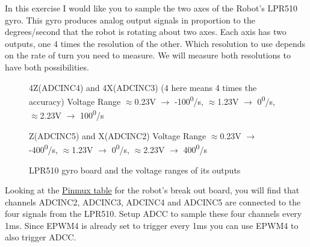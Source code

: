 \documentclass[11pt]{article}
\begin{document}
In this exercise I would like you to sample the two axes of the Robot’s LPR510 gyro. This gyro produces analog output signals in proportion to the degrees/second that the robot is rotating about two axes. Each axis has two outputs, one 4 times the resolution of the other. Which resolution to use depends on the rate of turn you need to measure. We will measure both resolutions to have both possibilities.
%
\begin{figure}[H]
    \centering

    \smallskip
    {\small 4Z(ADCINC4) and 4X(ADCINC3) (4 here means 4 times the accuracy) Voltage Range $\approx$0.23V $\rightarrow$ -100\textsuperscript{0}/s, $\approx$1.23V $\rightarrow$ 0\textsuperscript{0}/s, $\approx$2.23V $\rightarrow$ 100\textsuperscript{0}/s

    Z(ADCINC5) and X(ADCINC2) Voltage Range $\approx$0.23V $\rightarrow$ -400\textsuperscript{0}/s, $\approx$1.23V $\rightarrow$ 0\textsuperscript{0}/s, $\approx$2.23V $\rightarrow$ 400\textsuperscript{0}/s\par}
    \caption{LPR510 gyro board and the voltage ranges of its outputs}
\end{figure}
%
Looking at the \href{http://coecsl.ece.illinois.edu/se423/Lab_PinMuxTableF28379DLaunchPadSE423Robot.pdf}{Pinmux table} for the robot’s break out board, you will find that channels ADCINC2, ADCINC3, ADCINC4 and ADCINC5 are connected to the four signals from the LPR510. Setup ADCC to sample these four channels every 1ms. Since EPWM4 is already set to trigger every 1ms you can use EPWM4 to also trigger ADCC.
%
\end{document}
